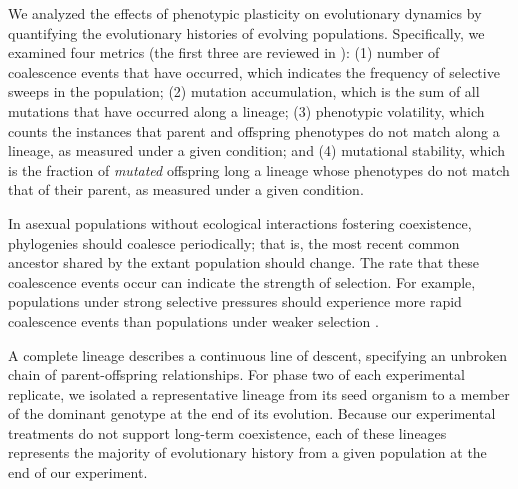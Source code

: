 We analyzed the effects of phenotypic plasticity on evolutionary dynamics by quantifying the evolutionary histories of evolving populations.
Specifically, we examined four metrics (the first three are reviewed in \citep{dolson_interpreting_2020}):
(1) number of coalescence events that have occurred, which indicates the frequency of selective sweeps in the population;
(2) mutation accumulation, which is the sum of all mutations that have occurred along a lineage;
(3) phenotypic volatility, which counts the instances that parent and offspring phenotypes do not match along a lineage, as measured under a given condition;
and (4) mutational stability, which is the fraction of \textit{mutated} offspring long a lineage whose phenotypes do not match that of their parent, as measured under a given condition.

In asexual populations without ecological interactions fostering coexistence, phylogenies should coalesce periodically; that is, the most recent common ancestor shared by the extant population should change.
The rate that these coalescence events occur can indicate the strength of selection.
For example, populations under strong selective pressures should experience more rapid coalescence events than populations under weaker selection \citep{dolson_interpreting_2020}.


A complete lineage describes a continuous line of descent, specifying an unbroken chain of parent-offspring relationships.
For phase two of each experimental replicate, we isolated a representative lineage from its seed organism to a member of the dominant genotype at the end of its evolution.
Because our experimental treatments do not support long-term coexistence, each of these lineages represents the majority of evolutionary history from a given population at the end of our experiment.



